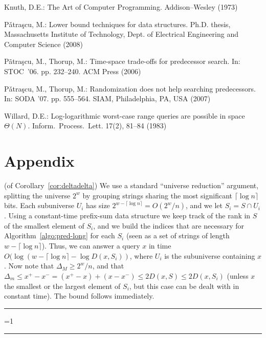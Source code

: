 \documentclass{article}
\newcounter{noqed}
\newcommand{\qed}{ \ifmmode\mbox{ }\fi\rule[-.05em]{.3em}{.7em}\setcounter{noqed}{0}}
\newenvironment{proof}[1][{}]{\noindent{\bf Proof#1. }\setcounter{noqed}{1}}{\ifnum\value{noqed}=1\qed\fi\par\medskip}
\newcommand{\?}{\mskip1.5mu}
\begin{document}
\begin{thebibliography}{10}
Knuth, D.E.: The Art of Computer Programming. Addison--Wesley (1973)

P{\v a}tra{\c s}cu, M.: Lower bound techniques for data structures. Ph.D.
  thesis, Massachusetts Institute of Technology, Dept. of Electrical
  Engineering and Computer Science (2008)

P{\~a}tra{\c{s}}cu, M., Thorup, M.: Time-space trade-offs for predecessor
  search. In: STOC~'06. pp. 232--240. ACM Press (2006)

P\v{a}tra\c{s}cu, M., Thorup, M.: Randomization does not help searching
  predecessors. In: SODA '07. pp. 555--564. SIAM, Philadelphia, PA, USA (2007)

Willard, D.E.: Log-logarithmic worst-case range queries are possible in space
  {$\Theta(N)$}. Inform.\ Process.\ Lett.  17(2),  81--84 (1983)

\end{thebibliography}

\section*{Appendix}

\begin{proof}(of Corollary~\ref{cor:deltadelta})
We use a standard ``universe reduction'' argument, splitting 
the universe $2^w$ by grouping strings sharing the most significant $\lceil \log
n\rceil$ bits. Each subuniverse $U_i$ has size $2^{w-\lceil \log
n\rceil}=O(2^w/n)$, and we let $S_i=S\cap U_i$. Using a constant-time
prefix-sum data structure we keep track of the rank in $S$ of the smallest
element of $S_i$, and we build the indices that are necessary for
Algorithm~\ref{algo:pred-long} for each $S_i$ (seen as a set of strings of
length $w-\lceil \log
n\rceil$). Thus, we can answer a query $x$ in time $O(\log(w-\lceil \log
n\rceil -\log D(x,S_i))$, where $U_i$ is the subuniverse containing $x$. Now
note that $\Delta_M\geq 2^w/n$, and that $\Delta_m\leq x^+-x^-
=(x^+-x)+(x-x^-)\leq 2D(x,S)\leq 2D(x,S_i)$ (unless $x$ the smallest or the
largest element of $S_i$, but this case can be dealt with in constant time). The
bound follows immediately.\qed
\end{proof}
\end{document}
